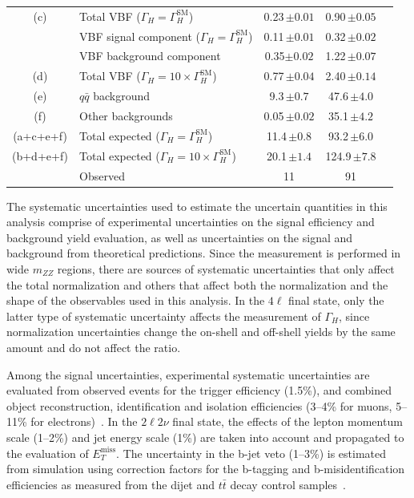 \begin{table}
\begin{tabular}{clccc}
\hline
(c)& Total VBF ($\Gamma_{H} = \Gamma_{H}^{\mathrm{SM}}$)         & 0.23\,$\pm 0.01$    & 0.90\,$\pm 0.05$ & \\
 & VBF signal component ($\Gamma_{H} = \Gamma_{H}^{\mathrm{SM}}$)          & 0.11\,$\pm 0.01$    & 0.32\,$\pm 0.02$ & \\
 & VBF background component                                                  & 0.35$\pm 0.02$      & 1.22\,$\pm 0.07$ & \\
(d)& Total VBF ($\Gamma_{H} = 10 \times \Gamma_{H}^{\mathrm{SM}}$)        & 0.77\,$\pm 0.04$  & 2.40\,$\pm 0.14$ & \\
\hline
(e)& $q\bar{q}$ background                      & 9.3\,$\pm 0.7$    & 47.6\,$\pm 4.0$ & \\
(f)& Other backgrounds                                             & 0.05\,$\pm 0.02$    & 35.1\,$\pm 4.2$ & \\
\hline
(a+c+e+f)& Total expected ($\Gamma_{H} = \Gamma_{H}^{\mathrm{SM}}$)       & 11.4\,$\pm 0.8$ & 93.2\,$\pm 6.0$ & \\
(b+d+e+f)& Total expected ($\Gamma_{H} = 10 \times \Gamma_{H}^{\mathrm{SM}}$) & 20.1\,$\pm1.4$  & 124.9\,$\pm 7.8$ & \\
\hline
& Observed                                                         & 11                & 91 & \\
\hline
\hline
\end{tabular}
\label{tab:yields}
\end{table}

The systematic uncertainties used to estimate the uncertain quantities in this analysis comprise of experimental uncertainties on the signal efficiency and
background yield evaluation, as well as uncertainties on the signal and background from
theoretical predictions. Since the measurement is performed in wide $m_{ZZ}$ regions, there
are sources of systematic uncertainties that only affect the total normalization and
others that affect both the normalization and the shape of the observables used in this
analysis. In the $4\ell$ final state, only the latter type of systematic uncertainty
affects the measurement of $\Gamma_{H}$, since normalization uncertainties change the on-shell
and off-shell yields by the same amount and do not affect the ratio.

Among the signal uncertainties, experimental systematic uncertainties are evaluated
from observed events for the trigger efficiency (1.5\%), and combined object reconstruction,
identification and isolation efficiencies (3--4\% for muons, 5--11\% for electrons)~\cite{Chatrchyan:2013mxa}.
In the $2\ell 2\nu$ final state, the effects of the lepton momentum scale (1--2\%) and jet
energy scale (1\%) are taken into account and propagated to the evaluation of $E_{T}^{\text{miss}}$.
The uncertainty in the b-jet veto (1--3\%) is estimated from simulation using
correction factors for the b-tagging and b-misidentification efficiencies as measured
from the dijet and $t\bar{t}$ decay control samples~\cite{Chatrchyan:2012jua}.

